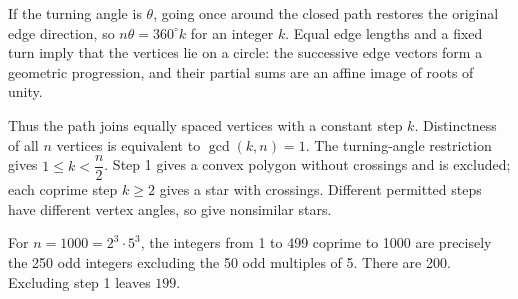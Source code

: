 If the turning angle is $\theta$, going once around the closed path restores the original edge direction, so $n\theta=360^\circ k$ for an integer $k$. Equal edge lengths and a fixed turn imply that the vertices lie on a circle: the successive edge vectors form a geometric progression, and their partial sums are an affine image of roots of unity.

Thus the path joins equally spaced vertices with a constant step $k$. Distinctness of all $n$ vertices is equivalent to $\gcd(k,n)=1$. The turning-angle restriction gives $1\le k<\dfrac{n}{2}$. Step 1 gives a convex polygon without crossings and is excluded; each coprime step $k\ge2$ gives a star with crossings. Different permitted steps have different vertex angles, so give nonsimilar stars.

For $n=1000=2^3\cdot5^3$, the integers from 1 to 499 coprime to 1000 are precisely the 250 odd integers excluding the 50 odd multiples of 5. There are 200. Excluding step 1 leaves $\boxed{199}$.

